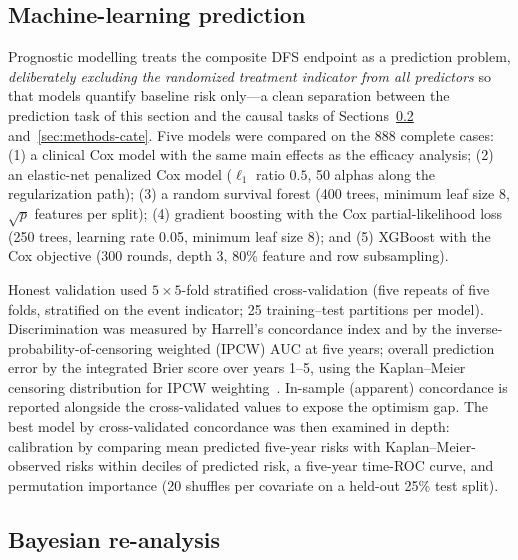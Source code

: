 \subsection{Machine-learning prediction}\label{sec:methods-ml}

Prognostic modelling treats the composite DFS endpoint as a prediction
problem, \emph{deliberately excluding the randomized treatment indicator
from all predictors} so that models quantify baseline risk only---a
clean separation between the prediction task of this section and the
causal tasks of Sections~\ref{sec:methods-bayes}
and~\ref{sec:methods-cate}. Five models were compared on the 888
complete cases: (1) a clinical Cox model with the same main effects as
the efficacy analysis; (2) an elastic-net penalized Cox model
($\ell_1$ ratio $0.5$, 50 alphas along the regularization path);
(3) a random survival forest (400 trees, minimum leaf size 8, $\sqrt{p}$
features per split); (4) gradient boosting with the Cox partial-likelihood
loss (250 trees, learning rate 0.05, minimum leaf size 8); and (5)
XGBoost with the Cox objective (300 rounds, depth 3, 80\% feature and
row subsampling).

Honest validation used $5\times5$-fold stratified cross-validation
(five repeats of five folds, stratified on the event indicator; 25
training--test partitions per model). Discrimination was measured by
Harrell's concordance index and by the inverse-probability-of-censoring
weighted (IPCW) AUC at five years; overall prediction error by the
integrated Brier score over years 1--5, using the Kaplan--Meier censoring
distribution for IPCW weighting~\cite{graf1999}. In-sample (apparent)
concordance is reported alongside the cross-validated values to expose
the optimism gap. The best model by cross-validated concordance was then
examined in depth: calibration by comparing mean predicted five-year
risks with Kaplan--Meier-observed risks within deciles of predicted
risk, a five-year time-ROC curve, and permutation importance (20
shuffles per covariate on a held-out 25\% test split).

\subsection{Bayesian re-analysis}\label{sec:methods-bayes}

